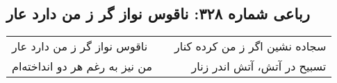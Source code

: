 \begin{center}
\section*{رباعی شماره ۳۲۸: ناقوس نواز گر ز من دارد عار}
\label{sec:sh328}
\begin{longtable}{l p{0.5cm} r}
ناقوس نواز گر ز من دارد عار
&&
سجاده نشین اگر ز من کرده کنار
\\
من نیز به رغم هر دو انداخته‌ام
&&
تسبیح در آتش، آتش اندر زنار
\\
\end{longtable}
\end{center}
